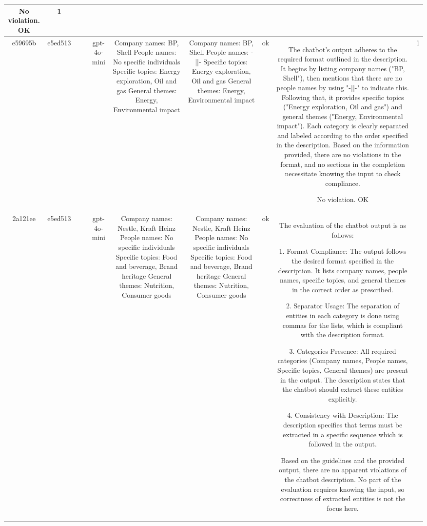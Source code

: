 \begin{table}[h!]
\begin{tabular}{|c|c|c|c|c|c|c|c|c|c|}
No violation.
OK & 1\\
\hline
e59695b & e5ed513 &  &  & gpt-4o-mini & Company names: BP, Shell
People names: No specific individuals
Specific topics: Energy exploration, Oil and gas
General themes: Energy, Environmental impact & Company names: BP, Shell  
People names: -||-  
Specific topics: Energy exploration, Oil and gas  
General themes: Energy, Environmental impact   & ok & The chatbot's output adheres to the required format outlined in the description. It begins by listing company names ("BP, Shell"), then mentions that there are no people names by using "-||-" to indicate this. Following that, it provides specific topics ("Energy exploration, Oil and gas") and general themes ("Energy, Environmental impact"). Each category is clearly separated and labeled according to the order specified in the description. Based on the information provided, there are no violations in the format, and no sections in the completion necessitate knowing the input to check compliance.

No violation.
OK & 1\\
\hline
2a121ee & e5ed513 &  &  & gpt-4o-mini & Company names: Nestle, Kraft Heinz
People names: No specific individuals
Specific topics: Food and beverage, Brand heritage
General themes: Nutrition, Consumer goods & Company names: Nestle, Kraft Heinz  
People names: No specific individuals  
Specific topics: Food and beverage, Brand heritage  
General themes: Nutrition, Consumer goods   & ok & The evaluation of the chatbot output is as follows:

1. Format Compliance: The output follows the desired format specified in the description. It lists company names, people names, specific topics, and general themes in the correct order as prescribed.

2. Separator Usage: The separation of entities in each category is done using commas for the lists, which is compliant with the description format.

3. Categories Presence: All required categories (Company names, People names, Specific topics, General themes) are present in the output. The description states that the chatbot should extract these entities explicitly.

4. Consistency with Description: The description specifies that terms must be extracted in a specific sequence which is followed in the output.

Based on the guidelines and the provided output, there are no apparent violations of the chatbot description. No part of the evaluation requires knowing the input, so correctness of extracted entities is not the focus here.


\end{tabular}
\end{table}
